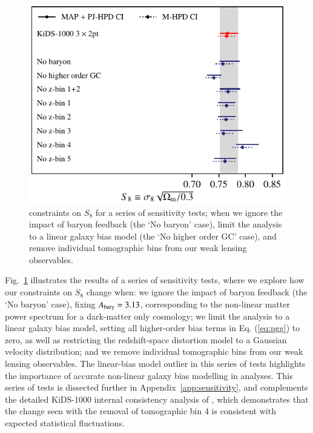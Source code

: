 \begin{figure}
	\begin{center}
		\includegraphics[width=\columnwidth]{Parameter_Plots/systematics/S8_comparison_blindC}
		\caption{\tttp constraints on $S_8$ for a series of sensitivity tests; when we ignore the impact of baryon feedback (the `No baryon' case), limit the analysis to a linear galaxy bias model (the `No higher order GC' case), and remove individual tomographic bins from our weak lensing observables.  
		\label{fig:S8comp_sensitivity}}
	\end{center}
\end{figure}

Fig.~\ref{fig:S8comp_sensitivity} illustrates the results of a series of sensitivity tests, where we explore how our \tttp constraints on $S_8$ change when: 
we ignore the impact of baryon feedback (the `No baryon' case), fixing $A_{\rm bary}=3.13$, corresponding to the non-linear matter power spectrum for a dark-matter only cosmology; 
we limit the analysis to a linear galaxy bias model, setting all higher-order bias terms in Eq. (\ref{eq:pgg}) to zero, as well as restricting the redshift-space distortion model to a Gaussian velocity distribution; 
and we remove individual tomographic bins from our weak lensing observables. 
The linear-bias model outlier in this series of tests highlights the importance of accurate non-linear galaxy bias modelling in \tttp analyses.     
This series of tests is dissected further in Appendix~\ref{app:sensitivity}, and complements the detailed KiDS-1000 internal consistency analysis of \citet{asgari/etal:inprep}, which demonstrates that the change seen with the removal of tomographic bin 4 is consistent with expected statistical fluctuations.

